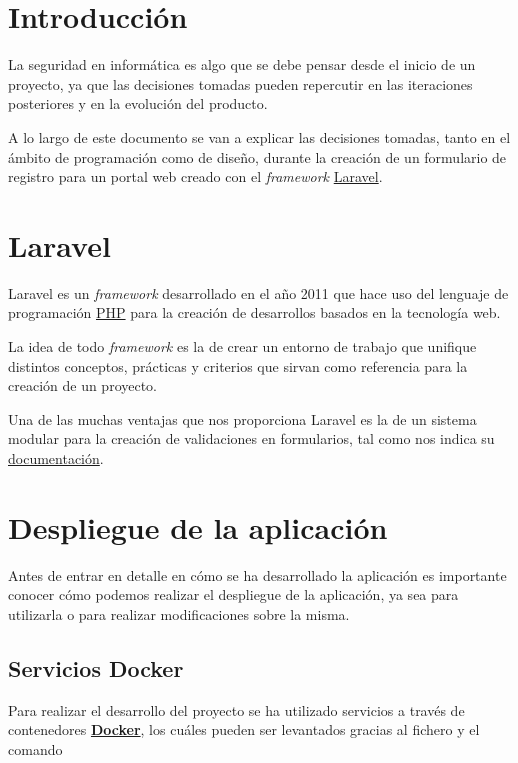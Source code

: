 \documentclass{\ClassPath/viu-tfm-template}
\begin{document}
\graphicspath{{../../VIU_TFM_LaTeX_template/}}

\coverpage

\tableofcontents

\chapter{Introducción}

La seguridad en informática es algo que se debe pensar desde el inicio de un proyecto, ya que las decisiones tomadas pueden repercutir en las iteraciones posteriores y en la evolución del producto.

A lo largo de este documento se van a explicar las decisiones tomadas, tanto en el ámbito de programación como de diseño, durante la creación de un formulario de registro para un portal web creado con el \textit{framework} \href{https://laravel.com/}{Laravel}.


\chapter{Laravel}

Laravel es un \textit{framework} desarrollado en el año 2011 que hace uso del lenguaje de programación \href{https://www.php.net/}{PHP} para la creación de desarrollos basados en la tecnología web.

La idea de todo \textit{framework} es la de crear un entorno de trabajo que unifique distintos conceptos, prácticas y criterios que sirvan como referencia para la creación de un proyecto.

Una de las muchas ventajas que nos proporciona Laravel es la de un sistema modular para la creación de validaciones en formularios, tal como nos indica su \href{https://laravel.com/docs/6.x/validation}{documentación}.

\chapter{Despliegue de la aplicación}
Antes de entrar en detalle en cómo se ha desarrollado la aplicación es importante conocer cómo podemos realizar el despliegue de la aplicación, ya sea para utilizarla o para realizar modificaciones sobre la misma.

\section{Servicios Docker}
Para realizar el desarrollo del proyecto se ha utilizado servicios a través de contenedores \textbf{\href{https://www.docker.com/}{Docker}}, los cuáles pueden ser levantados gracias al fichero  y el comando 
\end{document}
